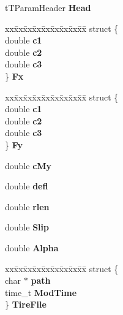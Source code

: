 \begin{DoxyCompactItemize}
\mbox{\label{structt_my_model_a0d3f1620043a55feede7f7d1aff501fe}} 
t\+T\+Param\+Header {\bfseries Head}
\item 
\mbox{\label{structt_my_model_a1f1d7a296434408265e4e8abceed61fe}} 
\begin{tabbing}
xx\=xx\=xx\=xx\=xx\=xx\=xx\=xx\=xx\=\kill
struct \{\\
\>double {\bfseries c1}\\
\>double {\bfseries c2}\\
\>double {\bfseries c3}\\
\} {\bfseries Fx}\\

\end{tabbing}\item 
\mbox{\label{structt_my_model_aa00ae2bfc0954fe1a2de2dcaa24f4eb0}} 
\begin{tabbing}
xx\=xx\=xx\=xx\=xx\=xx\=xx\=xx\=xx\=\kill
struct \{\\
\>double {\bfseries c1}\\
\>double {\bfseries c2}\\
\>double {\bfseries c3}\\
\} {\bfseries Fy}\\

\end{tabbing}\item 
\mbox{\label{structt_my_model_a8fc3688dbcd9b87b19345834871bd287}} 
double {\bfseries c\+My}
\item 
\mbox{\label{structt_my_model_ad196e04815d314c9d3737846a3c057e8}} 
double {\bfseries defl}
\item 
\mbox{\label{structt_my_model_af6a8e0a1baad2c5a98aadd148ef330fa}} 
double {\bfseries rlen}
\item 
\mbox{\label{structt_my_model_aa7e47e60c9350f8a0839438502455ac5}} 
double {\bfseries Slip}
\item 
\mbox{\label{structt_my_model_a1d2fc9fc03c64348b1ba7d7abb2f1bb7}} 
double {\bfseries Alpha}
\item 
\mbox{\label{structt_my_model_adfe24a0c0dbec97f56bdbf1af1637dc4}} 
\begin{tabbing}
xx\=xx\=xx\=xx\=xx\=xx\=xx\=xx\=xx\=\kill
struct \{\\
\>char $\ast$ {\bfseries path}\\
\>time\_t {\bfseries ModTime}\\
\} {\bfseries TireFile}\\


\end{tabbing}
\end{DoxyCompactItemize}
